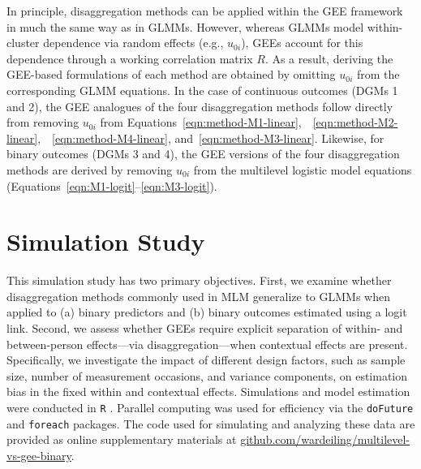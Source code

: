 \documentclass[stu]{apa7}
\begin{document}

In principle, disaggregation methods can be applied within the GEE framework in much the same way as in GLMMs. However, whereas GLMMs model within-cluster dependence via random effects (e.g., $u_{0i}$), GEEs account for this dependence through a working correlation matrix $R$. As a result, deriving the GEE-based formulations of each method are obtained by omitting $u_{0i}$ from the corresponding GLMM equations. In the case of continuous outcomes (DGMs 1 and 2), the GEE analogues of the four disaggregation methods follow directly from removing $u_{0i}$ from Equations~\ref{eqn:method-M1-linear},~~\ref{eqn:method-M2-linear},~~\ref{eqn:method-M4-linear}, and~\ref{eqn:method-M3-linear}. Likewise, for binary outcomes (DGMs 3 and 4), the GEE versions of the four disaggregation methods are derived by removing $u_{0i}$ from the multilevel logistic model equations (Equations~\ref{eqn:M1-logit}–\ref{eqn:M3-logit}). 

\section{Simulation Study}

This simulation study has two primary objectives. First, we examine whether disaggregation methods commonly used in MLM generalize to GLMMs when applied to (a) binary predictors and (b) binary outcomes estimated using a logit link. Second, we assess whether GEEs require explicit separation of within- and between-person effects—via disaggregation—when contextual effects are present. Specifically, we investigate the impact of different design factors, such as sample size, number of measurement occasions, and variance components, on estimation bias in the fixed within and contextual effects. Simulations and model estimation were conducted in \texttt{R} \parencite[version 4.4.2;][]{r_core_team_r_2024}. Parallel computing was used for efficiency via the \texttt{doFuture} \parencite[version 1.0.2;][]{RJ-2021-048} and \texttt{foreach} \parencite[version 1.5.2;][]{daniel_foreach_2022} packages. The code used for simulating and analyzing these data are provided as online supplementary materials at \href{https://github.com/wardeiling/multilevel-vs-gee-binary}{github.com/wardeiling/multilevel-vs-gee-binary}.
\end{document}
